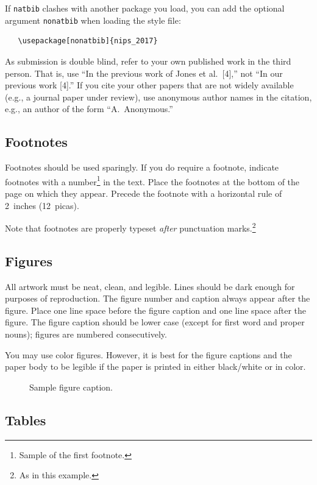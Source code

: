 \documentclass{article}
\begin{document}
If \verb+natbib+ clashes with another package you load, you can add
the optional argument \verb+nonatbib+ when loading the style file:
\begin{verbatim}
   \usepackage[nonatbib]{nips_2017}
\end{verbatim}

As submission is double blind, refer to your own published work in the
third person. That is, use ``In the previous work of Jones et
al.\ [4],'' not ``In our previous work [4].'' If you cite your other
papers that are not widely available (e.g., a journal paper under
review), use anonymous author names in the citation, e.g., an author
of the form ``A.\ Anonymous.''

\subsection{Footnotes}

Footnotes should be used sparingly.  If you do require a footnote,
indicate footnotes with a number\footnote{Sample of the first
  footnote.} in the text. Place the footnotes at the bottom of the
page on which they appear.  Precede the footnote with a horizontal
rule of 2~inches (12~picas).

Note that footnotes are properly typeset \emph{after} punctuation
marks.\footnote{As in this example.}

\subsection{Figures}

All artwork must be neat, clean, and legible. Lines should be dark
enough for purposes of reproduction. The figure number and caption
always appear after the figure. Place one line space before the figure
caption and one line space after the figure. The figure caption should
be lower case (except for first word and proper nouns); figures are
numbered consecutively.

You may use color figures.  However, it is best for the figure
captions and the paper body to be legible if the paper is printed in
either black/white or in color.
\begin{figure}[h]
  \centering
  \fbox{\rule[-.5cm]{0cm}{4cm} \rule[-.5cm]{4cm}{0cm}}
  \caption{Sample figure caption.}
\end{figure}

\subsection{Tables}
\end{document}
